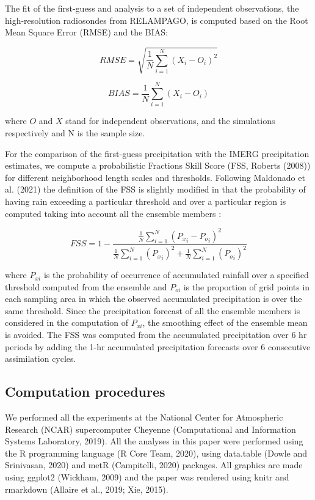 \documentclass[final,5p,times,twocolumn,authoryear]{elsarticle} %
\begin{document}
The fit of the first-guess and analysis to a set of independent observations, the high-resolution radiosondes from RELAMPAGO, is computed based on the Root Mean Square Error (RMSE) and the BIAS:

\[\mathit{RMSE} = \sqrt{\frac{1}{N}\sum_{i = 1}^{N} (X_i - O_i)^{2}}\]

\[\mathit{BIAS} = \frac{1}{N}\sum_{i = 1}^{N} (X_i - O_i)\]

where \(O\) and \(X\) stand for independent observations, and the simulations respectively and N is the sample size.

For the comparison of the first-guess precipitation with the IMERG precipitation estimates, we compute a probabilistic Fractions Skill Score (FSS, Roberts (2008)) for different neighborhood length scales and thresholds. Following Maldonado et al. (2021) the definition of the FSS is slightly modified in that the probability of having rain exceeding a particular threshold and over a particular region is computed taking into account all the ensemble members :

\[\mathit{FSS} = 1-\frac{\frac{1}{N}\sum_{i=1}^{N} ({P_x}_i-{P_o}_i)^{2}}{\frac{1}{N}\sum_{i=1}^{N} ({P_x}_i)^{2}+\frac{1}{N}\sum_{i=1}^{N} ({P_o}_i)^{2}} \]

where \(P_{xi}\) is the probability of occurrence of accumulated rainfall over a specified threshold computed from the ensemble and \(P_{oi}\) is the proportion of grid points in each sampling area in which the observed accumulated precipitation is over the same threshold. Since the precipitation forecast of all the ensemble members is considered in the computation of \(P_{xi}\), the smoothing effect of the ensemble mean is avoided. The FSS was computed from the accumulated precipitation over 6 hr periods by adding the 1-hr accumulated precipitation forecasts over 6 consecutive assimilation cycles.

\hypertarget{computation-procedures}{%
\subsection{Computation procedures}\label{computation-procedures}}

We performed all the experiments at the National Center for Atmospheric Research (NCAR) supercomputer Cheyenne (Computational and Information Systems Laboratory, 2019). All the analyses in this paper were performed using the R programming language (R Core Team, 2020), using data.table (Dowle and Srinivasan, 2020) and metR (Campitelli, 2020) packages.
All graphics are made using ggplot2 (Wickham, 2009) and the paper was rendered using knitr and rmarkdown (Allaire et al., 2019; Xie, 2015).
\end{document}

